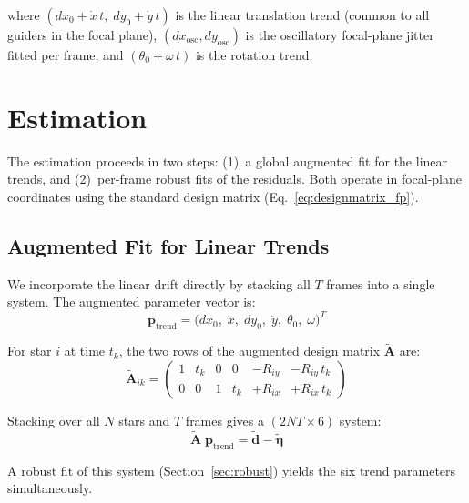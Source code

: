 \documentclass[SE,lsstdraft,authoryear,toc]{lsstdoc}
\newcommand{\Rix}{R_{ix}}
\newcommand{\Riy}{R_{iy}}
\begin{document}
\noindent
where $(dx_0 + \dot{x}\,t,\; dy_0 + \dot{y}\,t)$ is the linear
translation trend (common to all guiders in the focal plane),
$(dx_{\mathrm{osc}}, dy_{\mathrm{osc}})$ is the oscillatory
focal-plane jitter fitted per frame, and $(\theta_0 + \omega\,t)$ is
the rotation trend.

\section{Estimation}
\label{sec:estimation}

The estimation proceeds in two steps: (1)~a global augmented fit for
the linear trends, and (2)~per-frame robust fits of the residuals.
Both operate in focal-plane coordinates using the standard design
matrix (Eq.~\ref{eq:designmatrix_fp}).

\subsection{Augmented Fit for Linear Trends}
\label{sec:augmented}

We incorporate the linear drift directly by stacking all $T$ frames
into a single system.  The augmented parameter vector is:
\begin{equation}
\mathbf{p}_{\mathrm{trend}}
= \bigl(dx_0,\;\dot{x},\;
         dy_0,\;\dot{y},\;
         \theta_0,\;\omega\bigr)^T
\label{eq:ptrend}
\end{equation}

\noindent
For star $i$ at time $t_k$, the two rows of the augmented design
matrix $\widetilde{\mathbf{A}}$ are:
\begin{equation}
\widetilde{\mathbf{A}}_{ik} =
\begin{pmatrix}
1 & t_k & 0 & 0 & -\Riy & -\Riy\,t_k \\
0 & 0   & 1 & t_k & +\Rix & +\Rix\,t_k
\end{pmatrix}
\label{eq:augmented_A}
\end{equation}

\noindent
Stacking over all $N$ stars and $T$ frames gives a
$(2NT \times 6)$ system:
\begin{equation}
\widetilde{\mathbf{A}}\;\mathbf{p}_{\mathrm{trend}}
= \widetilde{\mathbf{d}} - \widetilde{\symbf{\eta}}
\label{eq:augmented_system}
\end{equation}

\noindent
A robust fit of this system (Section~\ref{sec:robust}) yields the six
trend parameters simultaneously.
\end{document}
